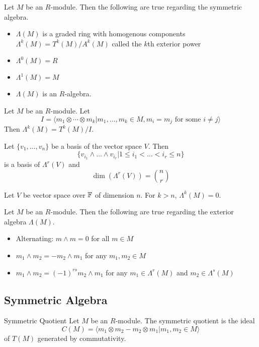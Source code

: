 \documentclass[a4paper]{article}
\begin{document}
\begin{prp}{}{} Let $M$ be an $R$-module. Then the following are true regarding the symmetric algebra. 
\begin{itemize}
\item $\Lambda(M)$ is a graded ring with homogenous components $\Lambda^k(M)=T^k(M)/A^k(M)$ called the $k$th exterior power
\item $\Lambda^0(M)=R$
\item $\Lambda^1(M)=M$
\item $\Lambda(M)$ is an $R$-algebra. 
\end{itemize}
\end{prp}

\begin{thm}{}{} Let $M$ be an $R$-module. Let $$I=\langle m_1\otimes\cdots\otimes m_k|m_1,\dots,m_k\in M, m_i=m_j\text{ for some }i\neq j\rangle$$ Then $\Lambda^k(M)=T^k(M)/I$. 
\end{thm}

\begin{prp}{}{} Let $\{v_1,\dots,v_n\}$ be a basis of the vector space $V$. Then $$\{v_{i_1}\wedge\dots\wedge v_{i_r}|1\leq i_1<\dots<i_r\leq n\}$$ is a basis of $\Lambda^r(V)$ and $$\dim(\Lambda^r(V))=\binom{n}{r}$$
\end{prp}

\begin{crl}{}{} Let $V$ be vector space over $\mathbb{F}$ of dimension $n$. For $k>n$, $\Lambda^k(M)=0$. 
\end{crl}

\begin{lmm}{}{} Let $M$ be an $R$-module. Then the following are true regarding the exterior algebra $\Lambda(M)$. 
\begin{itemize}
\item Alternating: $m\wedge m=0$ for all $m\in M$
\item $m_1\wedge m_2=-m_2\wedge m_1$ for any $m_1,m_2\in M$
\item $m_1\wedge m_2=(-1)^{rs}m_2\wedge m_1$ for any $m_1\in\Lambda^r(M)$ and $m_2\in\Lambda^s(M)$
\end{itemize}
\end{lmm}

\subsection{Symmetric Algebra}
\begin{defn}{Symmetric Quotient}{} Let $M$ be an $R$-module. The symmetric quotient is the ideal $$C(M)=\langle m_1\otimes m_2-m_2\otimes m_1|m_1,m_2\in M\rangle$$ of $T(M)$ generated by commutativity. 
\end{defn}
\end{document}
